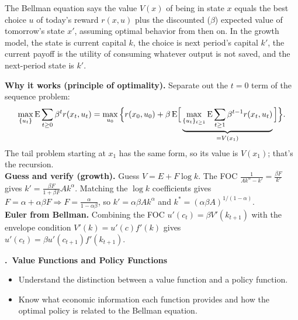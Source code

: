 \documentclass[11pt]{article}
\newcounter{qn}
\newcommand{\question}[1]{\par\needspace{14\baselineskip}\refstepcounter{qn}\medskip
{\bfseries\color{ink}\large \theqn.\ #1}\par\smallskip}
\begin{document}
\begin{resp}
The Bellman equation says the value $V(x)$ of being in state $x$ equals the best choice $u$ of today's reward $r(x,u)$ plus the discounted ($\beta$) expected value of tomorrow's state $x'$, assuming optimal behavior from then on. In the growth model, the state is current capital $k$, the choice is next period's capital $k'$, the current payoff is the utility of consuming whatever output is not saved, and the next-period state is $k'$.
\end{resp}
\begin{intu}
\textbf{Why it works (principle of optimality).} Separate out the $t=0$ term of the sequence problem:
\[\max_{\{u_t\}}\mathrm{E}\sum_{t\ge0}\beta^tr(x_t,u_t)=\max_{u_0}\Big\{r(x_0,u_0)+\beta\,\mathrm{E}\Big[\underbrace{\max_{\{u_t\}_{t\ge1}}\mathrm{E}\sum_{t\ge1}\beta^{t-1}r(x_t,u_t)}_{=V(x_1)}\Big]\Big\}.\]
The tail problem starting at $x_1$ has the same form, so its value is $V(x_1)$; that's the recursion.\\
\textbf{Guess and verify (growth).} Guess $V=E+F\log k$. The FOC $\frac{1}{Ak^\alpha-k'}=\frac{\beta F}{k'}$ gives $k'=\frac{\beta F}{1+\beta F}Ak^\alpha$. Matching the $\log k$ coefficients gives $F=\alpha+\alpha\beta F\Rightarrow F=\frac{\alpha}{1-\alpha\beta}$, so $k'=\alpha\beta Ak^\alpha$ and $k^*=(\alpha\beta A)^{1/(1-\alpha)}$.\\
\textbf{Euler from Bellman.} Combining the FOC $u'(c_t)=\beta V'(k_{t+1})$ with the envelope condition $V'(k)=u'(c)f'(k)$ gives $u'(c_t)=\beta u'(c_{t+1})f'(k_{t+1})$.
\end{intu}

\question{Value Functions and Policy Functions}
\begin{itemize}[leftmargin=1.2em,itemsep=0pt]\itshape
\item Understand the distinction between a value function and a policy function.
\item Know what economic information each function provides and how the optimal policy is related to the Bellman equation.
\end{itemize}
\end{document}
